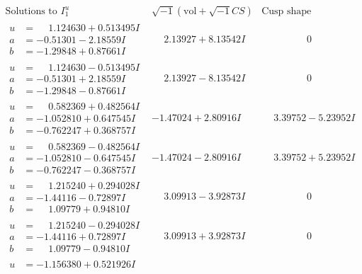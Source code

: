 \documentclass[1p]{elsarticle_modified}
\theoremstyle{definition}
\newcommand{\I}{\sqrt{-1}}
\begin{document}
$$\begin{array}{c|c|c}
\text{Solutions to }I^u_{1}& \I (\text{vol} + \sqrt{-1}CS) & \text{Cusp shape}\\
 \hline 
\begin{aligned}
u &= \phantom{-}1.124630 + 0.513495 I \\
a &= -0.51301 - 2.18559 I \\
b &= -1.29848 + 0.87661 I\end{aligned}
 & \phantom{-}2.13927 + 8.13542 I & \phantom{-0.000000 } 0 \\ \hline\begin{aligned}
u &= \phantom{-}1.124630 - 0.513495 I \\
a &= -0.51301 + 2.18559 I \\
b &= -1.29848 - 0.87661 I\end{aligned}
 & \phantom{-}2.13927 - 8.13542 I & \phantom{-0.000000 } 0 \\ \hline\begin{aligned}
u &= \phantom{-}0.582369 + 0.482564 I \\
a &= -1.052810 + 0.647545 I \\
b &= -0.762247 + 0.368757 I\end{aligned}
 & -1.47024 + 2.80916 I & \phantom{-}3.39752 - 5.23952 I \\ \hline\begin{aligned}
u &= \phantom{-}0.582369 - 0.482564 I \\
a &= -1.052810 - 0.647545 I \\
b &= -0.762247 - 0.368757 I\end{aligned}
 & -1.47024 - 2.80916 I & \phantom{-}3.39752 + 5.23952 I \\ \hline\begin{aligned}
u &= \phantom{-}1.215240 + 0.294028 I \\
a &= -1.44116 - 0.72897 I \\
b &= \phantom{-}1.09779 + 0.94810 I\end{aligned}
 & \phantom{-}3.09913 - 3.92873 I & \phantom{-0.000000 } 0 \\ \hline\begin{aligned}
u &= \phantom{-}1.215240 - 0.294028 I \\
a &= -1.44116 + 0.72897 I \\
b &= \phantom{-}1.09779 - 0.94810 I\end{aligned}
 & \phantom{-}3.09913 + 3.92873 I & \phantom{-0.000000 } 0 \\ \hline\begin{aligned}
u &= -1.156380 + 0.521926 I \\

\end{aligned}
\end{array}$$
\end{document}
